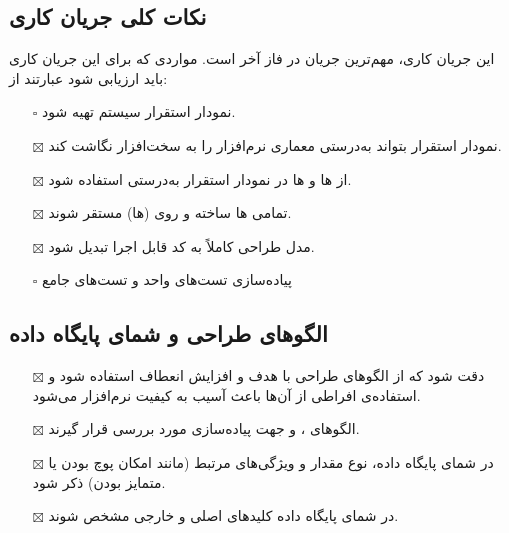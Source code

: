 \subsection{\hspace*{0.2cm}نکات کلی جریان کاری }
این جریان کاری، مهم‌ترین جریان در فاز آخر است. مواردی که برای این جریان کاری باید ارزیابی شود عبارتند از:
\begin{itemize} \setlength\itemsep{0cm}
	\item[$\square$]
	نمودار استقرار سیستم تهیه شود.
	\item[$\boxtimes$]
	نمودار استقرار بتواند به‌درستی معماری نرم‌افزار را به سخت‌افزار نگاشت کند.
	\item[$\boxtimes$]
	از  ها و  ها در نمودار استقرار به‌درستی استفاده شود.
	\item[$\boxtimes$]
	تمامی  ها ساخته و روی  (ها) مستقر شوند.
	\item[$\boxtimes$]
	مدل طراحی کاملاً به کد قابل اجرا تبدیل شود.
	\item[$\square$]
	پیاده‌سازی تست‌های واحد و تست‌های جامع

\end{itemize}

\subsection{\hspace*{0.2cm} الگوهای طراحی و شمای پایگاه داده}
\begin{itemize} \setlength\itemsep{0cm}
	\item[$\boxtimes$]
	دقت شود که از الگوهای طراحی با هدف  و افزایش انعطاف استفاده شود و استفاده‌ی افراطی از آن‌ها باعث آسیب به کیفیت نرم‌افزار می‌شود.
	\item[$\boxtimes$]
	الگوهای  ،  و  جهت پیاده‌سازی مورد بررسی قرار گیرند.
	\item[$\boxtimes$]
	در شمای پایگاه داده، نوع مقدار و ویژگی‌های مرتبط (مانند امکان پوچ بودن یا متمایز بودن) ذکر شود.
	\item[$\boxtimes$]
	در شمای پایگاه داده کلیدهای اصلی و خارجی مشخص شوند.
\end{itemize}

